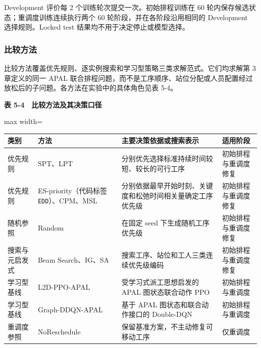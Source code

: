 \documentclass[journal,10pt]{IEEEtran}
\renewcommand{\arraystretch}{1.08}
\begin{document}
Development 评价每 2 个训练轮次提交一次。初始排程训练在 60 轮内保存候选状态；重调度训练连续执行两个 60 轮阶段，并在各阶段沿用相同的 Development 选择规则。Locked test 结果均不用于决定停止或模型选择。

\subsubsection{比较方法}\label{ux6bd4ux8f83ux65b9ux6cd5}

比较方法覆盖优先规则、逐实例搜索和学习型策略三类求解范式。它们均求解第 3 章定义的同一 APAL 联合排程问题，而不是工序顺序、站位分配或人员配置经过放松后的子问题。各方法在实验中的具体角色见表 5-4。

\begin{table}[!t]
\centering
\footnotesize
\textbf{表 5-4　比较方法及其决策口径}\par\smallskip
\setlength{\tabcolsep}{3pt}
\renewcommand{\arraystretch}{1.08}
\begin{adjustbox}{max width=\textwidth}
\begin{tabular}{@{}
  >{\raggedright\arraybackslash}p{}
  >{\raggedright\arraybackslash}p{}
  >{\raggedright\arraybackslash}p{}
  >{\raggedright\arraybackslash}p{}@{}}
\toprule
\begin{minipage}[b]{\linewidth}\raggedright
类别
\end{minipage} & \begin{minipage}[b]{\linewidth}\raggedright
方法
\end{minipage} & \begin{minipage}[b]{\linewidth}\raggedright
主要决策依据或搜索表示
\end{minipage} & \begin{minipage}[b]{\linewidth}\raggedright
适用阶段
\end{minipage} \\
\midrule
优先规则 & SPT、LPT & 分别优先选择标准持续时间较短、较长的可行工序 & 初始排程与重调度修复 \\
优先规则 & ES-priority（代码标签 \texttt{EDD}）、CPM、MSL & 分别依据最早开始时刻、关键度和松弛时间相关量确定工序优先级 & 初始排程与重调度修复 \\
随机参照 & Random & 在固定 seed 下生成随机工序优先级 & 初始排程与重调度修复 \\
搜索与元启发式 & Beam Search、IG、SA & 搜索工序、站位和工人三类连续优先级编码 & 初始排程与重调度修复 \\
学习型基线 & L2D-PPO-APAL & 受学习式派工思想启发的 APAL 图状态联合动作 PPO & 初始排程与重调度 \\
学习型基线 & Graph-DDQN-APAL & 基于 APAL 图状态和联合动作接口的 Double-DQN & 初始排程与重调度 \\
重调度参照 & No\allowbreak{}Reschedule & 保留基准方案，不主动修复可移动工序 & 仅重调度 \\
\bottomrule
\end{tabular}
\end{adjustbox}
\end{table}
\end{document}
